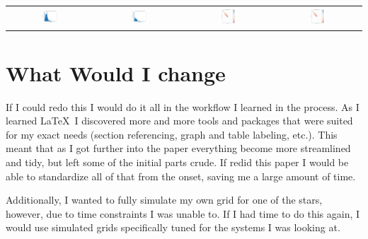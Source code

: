 \documentclass[12pt, a4paper]{article}
\begin{document}
\begin{center}
\begin{tabular}{cccc}
        \includegraphics[width=0.22\textwidth]{figs/GeneratedFigs/W_UMa/ContactBinaries_Star_One_Mass_Distribution.png} &
        \includegraphics[width=0.22\textwidth]{figs/GeneratedFigs/W_UMa/ContactBinaries_Star_Two_Mass_Distribution.png} &
        \includegraphics[width=0.22\textwidth]{figs/GeneratedFigs/W_UMa/ContactbinaryHRDiagram.png} &
        \includegraphics[width=0.22\textwidth]{figs/GeneratedFigs/W_UMa/WUMaHRDiagram.png}\\
        
    \end{tabular}
\end{center}

    
\section{What Would I change}

    If I could redo this I would do it all in the workflow I learned in the process. As I learned \LaTeX~I discovered more and more tools and packages that were suited for my exact needs (section referencing, graph and table labeling, etc.). This meant that as I got further into the paper everything become more streamlined and tidy, but left some of the initial parts crude. If redid this paper I would be able to standardize all of that from the onset, saving me a large amount of time.

    Additionally, I wanted to fully simulate my own grid for one of the stars, however, due to time constraints I was unable to. If I had time to do this again, I would use simulated grids specifically tuned for the systems I was looking at.
\end{document}
